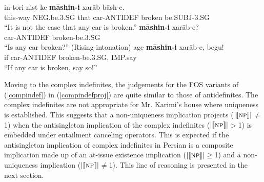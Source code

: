 \documentclass{salt}
\begin{document}
	\begin {exe}
	\ex \label {antidefproj}\begin {xlist}
	\ex \label {antidefprojneg}
		\gll	in-tori	nist		ke 	\textbf{m\={a}shin-{\color {blue}i}} xar\={a}b b\={a}sh-e.\\
			this-way	{\scriptsize NEG}.be{\scriptsize .3.SG}	that car-{\scriptsize ANTIDEF} 	broken be{\scriptsize .SUBJ-3.SG}\\			
			``It is not the case that any car is broken.''
	\ex \label {antidefprojqu}	
		\gll	\textbf{m\={a}shin-{\color {blue}i}} xar\={a}b-e?\\
			car-{\scriptsize ANTIDEF} 	broken-be{\scriptsize .3.SG}\\
			``Is any car broken?'' (Rising intonation)
	\ex	\label {antidefprojcon}
		\gll	age \textbf{m\={a}shin-{\color {blue}i}}	xar\={a}b-e, begu!\\
			if 	car-{\scriptsize ANTIDEF} 	broken-be{\scriptsize .3.SG}, {\scriptsize IMP}.say\\
			``If any car is broken, say so!''
	\end {xlist}
	\end {exe}

Moving to the complex indefinites, the judgements for the FOS variants of (\ref{compindef}) in (\ref{compindefproj}) are quite similar to those of antidefinites. The complex indefinites are not appropriate for Mr. Karimi's house where uniqueness is established. This suggests that a non-uniqueness implication projects  ($|\llbracket \textsc{np}\rrbracket|$$\not=$1) when the antisingleton implication of the complex indefinites ($|\llbracket \textsc{np} \rrbracket|$$>$1) is embedded under entailment canceling operators. This is expected if the antisingleton implication of complex indefinites in Persian is a composite implication made up of an at-issue existence implication ($| \llbracket \textsc{np} \rrbracket |$$\geq$1) and a non-uniqueness implication ($| \llbracket \textsc{np} \rrbracket |$$\not =$1). This line of reasoning is presented in the next section.
\end{document}
